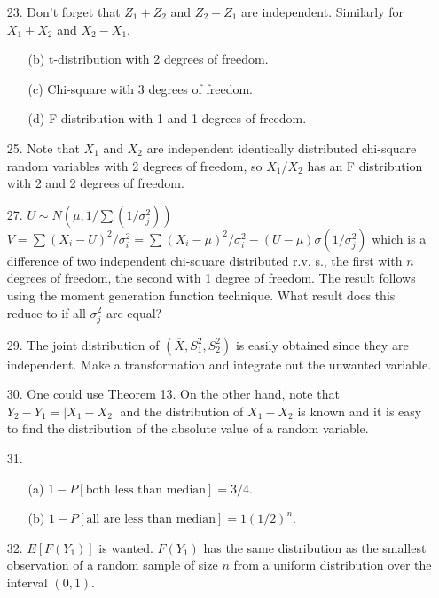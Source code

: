 \begin{enumerate}
	\newpage
	\item[23.] Don't forget that $Z_1+Z_2$ and $Z_2-Z_1$ are independent.  Similarly for $X_1+X_2$ and $X_2-X_1$.
	\begin{enumerate}
		\item[(b)] t-distribution with 2 degrees of freedom.
		\item[(c)] Chi-square with 3 degrees of freedom.
		\item[(d)] F distribution with 1 and 1 degrees of freedom.
	\end{enumerate}

	\item[25.] Note that $X_1$ and $X_2$ are independent identically distributed chi-square random variables with 2 degrees of freedom, so $X_1/X_2$ has an F distribution with 2 and 2 degrees of freedom.

	\item[27.] $U\sim N(\mu, 1/\sum(1/\sigma_j^2))$ \\
	$V = \sum(X_i-U)^2/\sigma_i^2 = \sum(X_i-\mu)^2/\sigma_i^2 - (U-\mu)\sigma(1/\sigma_j^2)$ which is a difference of two independent chi-square distributed r.v.
	s., the first with $n$ degrees of freedom, the second with 1 degree of freedom.  The result follows using the moment generation function technique.  What result does this reduce to if all $\sigma_j^2$ are equal?

	\item[29.] The joint distribution of $(\overline{X}, S_1^2, S_2^2)$ is easily obtained since they are independent. Make a transformation and integrate out the unwanted variable.

	\item[30.] One could use Theorem 13. On the other hand, note that $Y_2 - Y_1 = \vert X_1 - X_2\vert$ and the distribution of $X_1 - X_2$ is known and it is easy to find the distribution of the absolute value of a random variable.

	\item[31.] \begin{enumerate}
		\item[(a)] $1 - P[\mbox{both less than median}] = 3/4$.
		\item[(b)] $1 - P[\mbox{all are less than median}] = 1 (1/2)^n$. 
	\end{enumerate}
	
	\item[32.] $E[F(Y_1)]$ is wanted. $F(Y_1)$ has the same distribution as the smallest observation of a random sample of size $n$ from a uniform distribution over the interval $(0,1)$.


\end{enumerate}
